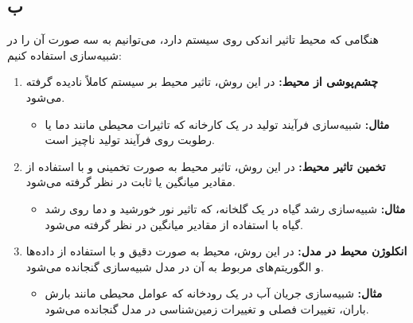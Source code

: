 \subsection*{ب}

هنگامی که محیط تاثیر اندکی روی سیستم دارد، می‌توانیم به سه صورت آن را در شبیه‌سازی استفاده کنیم:

\begin{enumerate}
	\item \textbf{چشم‌پوشی از محیط:} در این روش، تاثیر محیط بر سیستم کاملاً نادیده گرفته می‌شود. 
	\begin{itemize}
		\item \textbf{مثال:} شبیه‌سازی فرآیند تولید در یک کارخانه که تاثیرات محیطی مانند دما یا رطوبت روی فرآیند تولید ناچیز است.
	\end{itemize}
	\item \textbf{تخمین تاثیر محیط:} در این روش، تاثیر محیط به صورت تخمینی و با استفاده از مقادیر میانگین یا ثابت در نظر گرفته می‌شود.
	\begin{itemize}
		\item \textbf{مثال:} شبیه‌سازی رشد گیاه در یک گلخانه، که تاثیر نور خورشید و دما روی رشد گیاه با استفاده از مقادیر میانگین در نظر گرفته می‌شود.
	\end{itemize}
	\item \textbf{انکلوژن محیط در مدل:} در این روش، محیط به صورت دقیق و با استفاده از داده‌ها و الگوریتم‌های مربوط به آن در مدل شبیه‌سازی گنجانده می‌شود.
	\begin{itemize}
		\item \textbf{مثال:} شبیه‌سازی جریان آب در یک رودخانه که عوامل محیطی مانند بارش باران، تغییرات فصلی و تغییرات زمین‌شناسی در مدل گنجانده می‌شود.
	\end{itemize}
\end{enumerate}